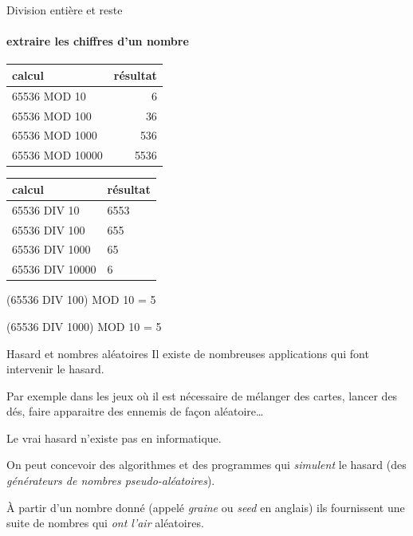 \begin{hideedit}
\begin{frame}[fragile]{Division entière et reste}
\framesubtitle{extraire les chiffres d'un nombre}
  \begin{center}
  \begin{tabular}{|l|r|}\hline
    \rowcolor{black!20}
    calcul & résultat \\
    \hline
    65536 MOD 10 & 6 \\
    65536 MOD 100 & 36 \\
    65536 MOD 1000 & 536 \\
    65536 MOD 10000 & 5536 \\
    \hline
  \end{tabular}
  \qquad
  \begin{tabular}{|l|l|}\hline
    \rowcolor{black!20}
    calcul & résultat \\
    \hline
    65536 DIV 10 & 6553 \\
    65536 DIV 100 & 655 \\
    65536 DIV 1000 & 65 \\
    65536 DIV 10000 & 6 \\
    \hline
  \end{tabular}
  \end{center}

  \begin{example}
    \pause
    (65536 DIV 100) MOD 10 = 5
  \end{example}

  \pause
  \begin{example}
    \pause
    (65536 DIV 1000) MOD 10 = 5  \end{example}
\end{frame}

\begin{frame}{Hasard et nombres aléatoires}
  Il existe de nombreuses applications qui font intervenir le hasard.

  Par exemple dans les jeux où il est nécessaire de mélanger des
  cartes, lancer des dés, faire apparaitre des ennemis de façon
  aléatoire\dots

  Le vrai hasard \og n’existe pas \fg en informatique.

  On peut concevoir des algorithmes et des programmes
  qui \emph{simulent} le hasard (des \emph{générateurs de nombres
  pseudo-aléatoires}).

  À partir d’un nombre donné
  (appelé \emph{graine} ou \emph{seed} en anglais)
  ils fournissent une suite de nombres qui \emph{ont l’air}
  aléatoires.
\end{frame}


\end{hideedit}
